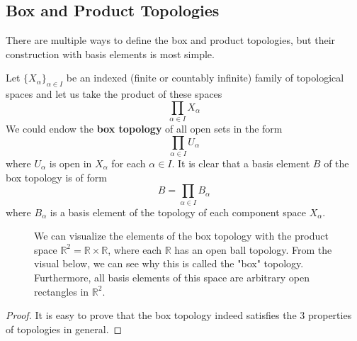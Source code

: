   \subsection{Box and Product Topologies} 

    There are multiple ways to define the box and product topologies, but their construction with basis elements is most simple. 

    \begin{theorem}
      Let $\{X_\alpha\}_{\alpha \in I}$ be an indexed (finite or countably infinite) family of topological spaces and let us take the product of these spaces
      \begin{equation}
        \prod_{\alpha \in I} X_\alpha
      \end{equation}
      We could endow the \textbf{box topology} of all open sets in the form
      \begin{equation}
        \prod_{\alpha \in I} U_\alpha
      \end{equation}
      where $U_\alpha$ is open in $X_\alpha$ for each $\alpha \in I$. It is clear that a basis element $B$ of the box topology is of form
      \begin{equation}
        B = \prod_{\alpha \in I} B_\alpha
      \end{equation}
      where $B_\alpha$ is a basis element of the topology of each component space $X_\alpha$. 
      \begin{figure}[H]
        \centering 
        \caption{We can visualize the elements of the box topology with the product space $\mathbb{R}^2 = \mathbb{R} \times \mathbb{R}$, where each $\mathbb{R}$ has an open ball topology. From the visual below, we can see why this is called the "box" topology. Furthermore, all basis elements of this space are arbitrary open rectangles in $\mathbb{R}^2$. }
        \label{fig:box_topology}
      \end{figure}
    \end{theorem}
    \begin{proof}
      It is easy to prove that the box topology indeed satisfies the 3 properties of topologies in general. 
    \end{proof}

